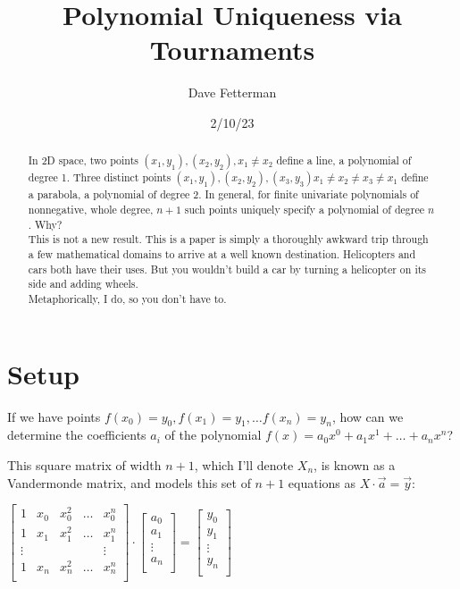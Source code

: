 \documentclass[11pt, oneside]{article} 	%
\title{Polynomial Uniqueness via Tournaments}
\author{Dave Fetterman}
\affil{Obviously Unemployed}
\date{2/10/23}
\begin{document}
\maketitle

\begin{abstract}

In 2D space, two points $(x_1, y_1), (x_2, y_2), x_1 \neq x_2$ define a line, a polynomial of degree 1.  Three distinct points $(x_1, y_1), (x_2, y_2), (x_3, y_3) x_1 \neq x_2 \neq x_3 \neq x_1$ define a parabola, a polynomial of degree 2.  In general, for finite univariate polynomials of nonnegative, whole degree, $n+1$ such points uniquely specify a polynomial of degree $n$.  Why?
\\

This is not a new result. This is a paper is simply a thoroughly awkward trip through a few mathematical domains to arrive at a well known destination. Helicopters and cars both have their uses. But you wouldn't build a car by turning a helicopter on its side and adding wheels.  
\\

Metaphorically, I do, so you don't have to.

\end{abstract}

\section{Setup}

If we have points $f(x_0) = y_0, f(x_1) = y_1,  \ldots f(x_{n}) = y_{n}$, how can we determine the coefficients $a_i$ of the polynomial $f(x) = a_0x^0 + a_1x^1 + \ldots + a_nx^n$?

This square matrix of width $n+1$, which I'll denote $X_n$, is known as a Vandermonde matrix\cite{1}, and models this set of $n+1$ equations as $X \cdot \vec{a} = \vec{y}$:

 $\begin{bmatrix}
1 & x_0 & x_0^2 & \ldots & x_0^{n} \\
1 & x_1 & x_1^2 & \ldots & x_1^{n} \\
\vdots & & & & \vdots  \\
1 & x_{n} & x_{n}^2 & \ldots & x_{n}^{n} \\
\end{bmatrix}
\cdot 
\begin{bmatrix}
a_0 \\
a_1 \\
\vdots \\
a_n \\
\end{bmatrix}
=
\begin{bmatrix}
y_0 \\
y_1 \\
\vdots \\
y_{n} \\
\end{bmatrix}
$
\\
\end{document}

